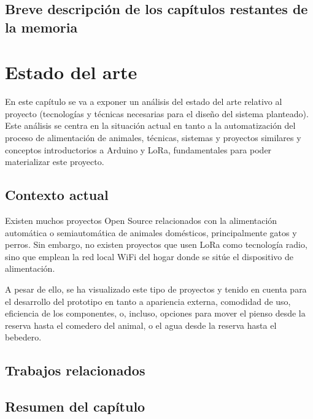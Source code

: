 \documentclass[12pt]{article}
\begin{document}
	\subsection[Breve descripción de los capítulos restantes de la memoria]{Breve descripción de los capítulos restantes de la memoria}
	
	\pagebreak
	

	\section[Estado del arte]{Estado del arte}  
	
	\noindent En este capítulo se va a exponer un análisis del estado del arte relativo al proyecto (tecnologías y técnicas necesarias para el diseño del sistema planteado). Este análisis se centra en la situación actual en tanto a  la automatización del proceso de alimentación de animales, técnicas, sistemas y proyectos similares y conceptos introductorios a Arduino y LoRa, fundamentales para poder materializar este proyecto.
	
	\subsection[Contexto actual]{Contexto actual}
	
		\noindent Existen muchos proyectos Open Source relacionados con la alimentación automática o semiautomática de animales domésticos, principalmente gatos y perros. Sin embargo, no existen proyectos que usen LoRa como tecnología radio, sino que emplean la red local WiFi del hogar donde se sitúe el dispositivo de alimentación.
	
	\noindent A pesar de ello, se ha visualizado este tipo de proyectos y tenido en cuenta para el desarrollo del prototipo en tanto a apariencia externa, comodidad de uso, eficiencia de los componentes, o, incluso, opciones para mover el pienso desde la reserva hasta el comedero del animal, o el agua desde la reserva hasta el bebedero.
	
	\subsection[Trabajos relacionados]{Trabajos relacionados}
	

	
	\subsection[Resumen del capítulo]{Resumen del capítulo}
	
\end{document}
